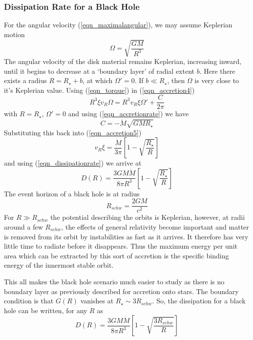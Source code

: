 \subsubsection{Dissipation Rate for a Black Hole}
For the angular velocity (\ref{eqn_maximalangular}), we may assume Keplerian motion
\begin{equation}
	\Omega = \sqrt{\frac{GM}{R^3}}
	\label{eqn_kepler}
\end{equation}
The angular velocity of the disk material remains Keplerian, increasing inward, until it begins to decrease at a `boundary layer' of radial
extent $b$. Here there exists a radius $R=R_\star + b$, at which $\Omega '=0$. If $b \ll R_\star$, then $\Omega$ is very close to it's
Keplerian value. Using (\ref{eqn_torque}) in (\ref{eqn_accretion4})
\begin{equation}
	R^3\xi v_R \Omega = R^3v_R\xi \Omega ' +\frac{C}{2\pi}
	\label{eqn_accretion5}
\end{equation}
with $R=R_\star$, $\Omega '=0$ and using (\ref{eqn_accretionrate}) we have
\begin{equation}
	C=- \dot M \sqrt{GMR_\star}
	\label{eqn_solnofc}
\end{equation}
Substituting this back into (\ref{eqn_accretion5})
\begin{equation}
	v_R\xi = \frac{\dot M}{3\pi}\left[1-\sqrt{\frac{R_\star}{R}} \right]
	\label{eqn_accretion5withsolnofc}
\end{equation}
and using (\ref{eqn_dissipationrate}) we arrive at
\begin{equation}
	D(R)=\frac{3GM\dot M}{8\pi R^3}\left[1-\sqrt{\frac{R_\star}{R}} \right]
	\label{eqn_dissipationratebh}
\end{equation}
The event horizon of a black hole is at radius
\begin{equation}
	R_{schw}=\frac{2GM}{c^2}
	\label{eqn_blackholeeventhorizon}
\end{equation}
For $R \gg R_{schw}$ the potential describing the orbits is Keplerian, however, at radii around a few $R_{schw}$, the effects of general
relativity become important and matter is removed from its orbit by instabilities as fast as it arrives. It therefore has very little
time to radiate before it disappears. Thus the maximum energy per unit area which can be extracted by this sort of accretion is the
specific binding energy of the innermost stable orbit.

This all makes the black hole scenario much easier to study as there is no boundary layer as previously described for accretion onto stars.
The boundary condition is that $G(R)$ vanishes at $R_\star \sim 3R_{schw}$. So, the dissipation for a black hole can be written, for any $R$
as
\begin{equation}
	D(R)=\frac{3GM\dot M}{8\pi R^3}\left[1-\sqrt{\frac{3R_{schw}}{R}} \right]
	\label{eqn_dissipationbh}
\end{equation}

